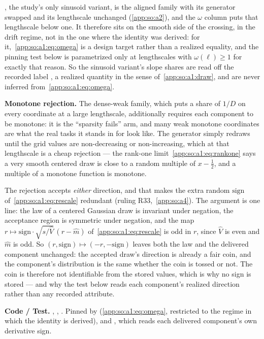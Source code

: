 , the study's only sinusoid variant, is the aligned
family with its generator swapped and its lengthscale unchanged
(\ref{app:so:a2}), and the $\omega$ column puts that lengthscale below one. It
therefore sits on the smooth side of the crossing, in the drift regime, not in
the one where the identity was derived: for it,~\eqref{app:so:a1:eq:omega} is
a design target rather than a realized equality, and the pinning test below is
parametrized only at lengthscales with $\omega(\ell)\ge1$ for exactly that
reason. So the sinusoid variant's slope shares are read off the recorded label
, a realized quantity in the sense of~\ref{app:so:a1:draw},
and are never inferred from~\eqref{app:so:a1:eq:omega}.

\textbf{Monotone rejection.} The dense-weak family, which puts a share of
$1/D$ on every coordinate at a large lengthscale, additionally requires each
component to be monotone: it is the ``sparsity fails'' arm, and many weak
monotone coordinates are what the real tasks it stands in for look like. The
generator simply redraws until the grid values are non-decreasing or
non-increasing, which at that lengthscale is a cheap rejection --- the
rank-one limit~\eqref{app:so:a1:eq:rankone} says a very smooth centered draw
is close to a random multiple of $x-\tfrac12$, and a multiple of a monotone
function is monotone.

The rejection accepts \emph{either} direction, and that makes the extra random
$\mathrm{sign}$ of~\eqref{app:so:a1:eq:rescale} redundant (ruling
R33,~\ref{app:so:a4}). The argument is one line: the law of a centered
Gaussian draw is invariant under negation, the acceptance region is symmetric
under negation, and the map
$r\mapsto\mathrm{sign}\cdot\sqrt{s/\hat V}\,(r-\hat m)$
of~\eqref{app:so:a1:eq:rescale} is odd in $r$, since $\hat V$
is even and $\hat m$ is odd. So $(r,\mathrm{sign})\mapsto(-r,-\mathrm{sign})$
leaves both the law and the delivered component unchanged: the accepted draw's
direction is already a fair coin, and the component's distribution is the same
whether the coin is tossed or not. The coin is therefore not identifiable from
the stored values, which is why no sign is stored --- and why the test below
reads each component's realized direction rather than any recorded attribute.

\begin{sloppypar}
\textbf{Code / Test.} ,
, . Pinned
by 
(\eqref{app:so:a1:eq:omega}, restricted to the regime in which the identity is
derived),
and ,
which reads each delivered component's own derivative sign.
\end{sloppypar}
